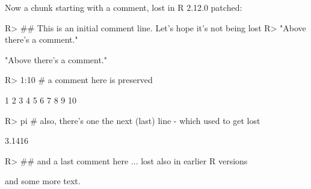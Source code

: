

Now a chunk starting with a comment, lost in R 2.12.0 patched:
\begin{Schunk}
\begin{Sinput}
R> ## This is an initial comment line. Let's hope it's not being lost
R> "Above there's a comment."
\end{Sinput}
\begin{Soutput}
[1] "Above there's a comment."
\end{Soutput}
\begin{Sinput}
R> 1:10 # a comment here is preserved
\end{Sinput}
\begin{Soutput}
 [1]  1  2  3  4  5  6  7  8  9 10
\end{Soutput}
\begin{Sinput}
R> pi   # also, there's one the next (last) line - which used to get lost
\end{Sinput}
\begin{Soutput}
[1] 3.1416
\end{Soutput}
\begin{Sinput}
R> ## and a last comment here ... lost also in earlier R versions
\end{Sinput}
\end{Schunk}

and some more text.
